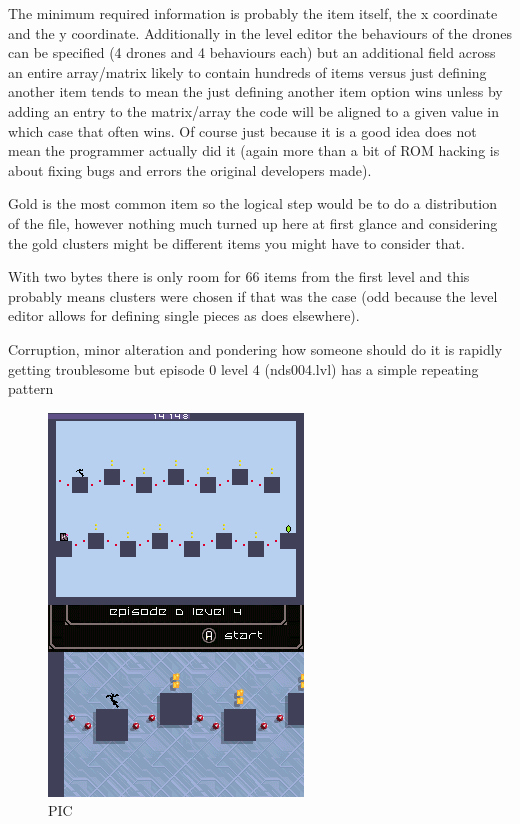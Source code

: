 \documentclass[
]{book}
\begin{document}
The minimum required information is probably the item itself, the x coordinate and the y coordinate. Additionally in the level editor the behaviours of the drones can be specified (4 drones and 4 behaviours each) but an additional field across an entire array/matrix likely to contain hundreds of items versus just defining another item tends to mean the just defining another item option wins unless by adding an entry to the matrix/array the code will be aligned to a given value in which case that often wins. Of course just because it is a good idea does not mean the programmer actually did it (again more than a bit of ROM hacking is about fixing bugs and errors the original developers made).

Gold is the most common item so the logical step would be to do a distribution of the file, however nothing much turned up here at first glance and considering the gold clusters might be different items you might have to consider that.

With two bytes there is only room for 66 items from the first level and this probably means clusters were chosen if that was the case (odd because the level editor allows for defining single pieces as does elsewhere).

Corruption, minor alteration and pondering how someone should do it is rapidly getting troublesome but episode 0 level 4 (nds004.lvl) has a simple repeating pattern

\begin{figure}
\centering
\includegraphics{images/179_home_fast6191_romhackingguide_unrenamed_fil___rs_romhackingguideleveleditingworkedNplus12.png}
\caption{PIC}
\end{figure}
\end{document}
